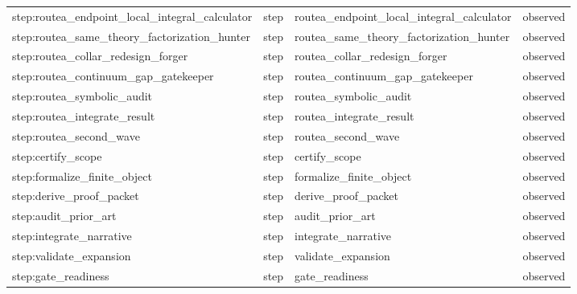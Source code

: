 \documentclass[10pt,a4paper]{article}
\begin{document}
\begin{longtable}{@{}>{\raggedright\arraybackslash}p{.22\linewidth}>{\raggedright\arraybackslash}p{.10\linewidth}>{\raggedright\arraybackslash}p{.38\linewidth}>{\raggedright\arraybackslash}p{.12\linewidth}@{}}
step:\allowbreak{}routea\_\allowbreak{}endpoint\_\allowbreak{}local\_\allowbreak{}integral\_\allowbreak{}calculator\allowbreak{} & step & routea\_\allowbreak{}endpoint\_\allowbreak{}local\_\allowbreak{}integral\_\allowbreak{}calculator\allowbreak{} & observed\\
step:\allowbreak{}routea\_\allowbreak{}same\_\allowbreak{}theory\_\allowbreak{}factorizat\allowbreak{}ion\_\allowbreak{}hunter & step & routea\_\allowbreak{}same\_\allowbreak{}theory\_\allowbreak{}factorizat\allowbreak{}ion\_\allowbreak{}hunter & observed\\
step:\allowbreak{}routea\_\allowbreak{}collar\_\allowbreak{}redesign\_\allowbreak{}forger & step & routea\_\allowbreak{}collar\_\allowbreak{}redesign\_\allowbreak{}forger & observed\\
step:\allowbreak{}routea\_\allowbreak{}continuum\_\allowbreak{}gap\_\allowbreak{}gatekeeper\allowbreak{} & step & routea\_\allowbreak{}continuum\_\allowbreak{}gap\_\allowbreak{}gatekeeper\allowbreak{} & observed\\
step:\allowbreak{}routea\_\allowbreak{}symbolic\_\allowbreak{}audit & step & routea\_\allowbreak{}symbolic\_\allowbreak{}audit & observed\\
step:\allowbreak{}routea\_\allowbreak{}integrate\_\allowbreak{}result & step & routea\_\allowbreak{}integrate\_\allowbreak{}result & observed\\
step:\allowbreak{}routea\_\allowbreak{}second\_\allowbreak{}wave & step & routea\_\allowbreak{}second\_\allowbreak{}wave & observed\\
step:\allowbreak{}certify\_\allowbreak{}scope & step & certify\_\allowbreak{}scope & observed\\
step:\allowbreak{}formalize\_\allowbreak{}finite\_\allowbreak{}object & step & formalize\_\allowbreak{}finite\_\allowbreak{}object & observed\\
step:\allowbreak{}derive\_\allowbreak{}proof\_\allowbreak{}packet & step & derive\_\allowbreak{}proof\_\allowbreak{}packet & observed\\
step:\allowbreak{}audit\_\allowbreak{}prior\_\allowbreak{}art & step & audit\_\allowbreak{}prior\_\allowbreak{}art & observed\\
step:\allowbreak{}integrate\_\allowbreak{}narrative & step & integrate\_\allowbreak{}narrative & observed\\
step:\allowbreak{}validate\_\allowbreak{}expansion & step & validate\_\allowbreak{}expansion & observed\\
step:\allowbreak{}gate\_\allowbreak{}readiness & step & gate\_\allowbreak{}readiness & observed\\
\bottomrule
\end{longtable}
\normalsize\endgroup
\end{document}
